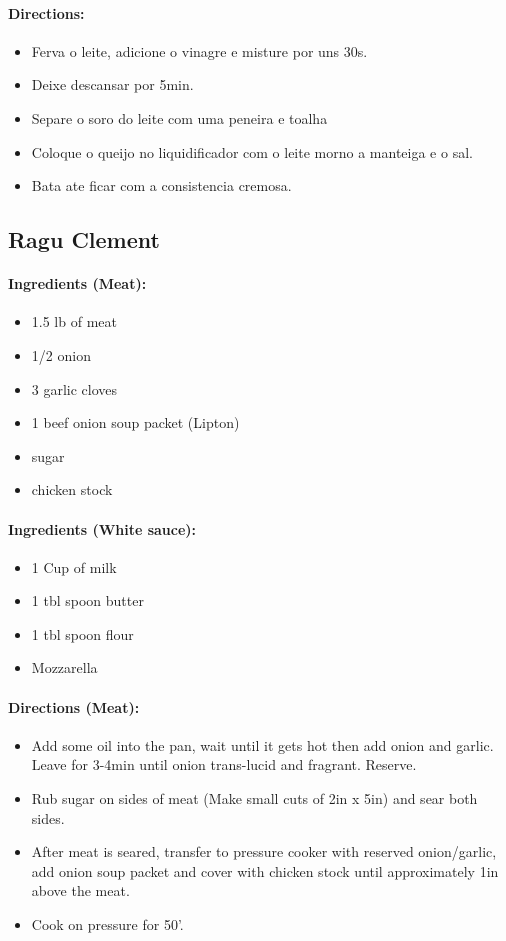 \documentclass{article}
\begin{document}
\paragraph{Directions:}
\begin{itemize}
	\item Ferva o leite, adicione o vinagre e misture por uns 30s.
	\item Deixe descansar por 5min.
	\item Separe o soro do leite com uma peneira e toalha
	\item Coloque o queijo no liquidificador com o leite morno a manteiga e o sal.
	\item Bata ate ficar com a consistencia cremosa.
\end{itemize}

\subsection{Ragu Clement}

\paragraph{Ingredients (Meat):}
\begin{itemize}
	\item 1.5 lb of meat
	\item 1/2 onion
	\item 3 garlic cloves
	\item 1 beef onion soup packet (Lipton)
	\item sugar
	\item chicken stock
\end{itemize}

\paragraph{Ingredients (White sauce):}
\begin{itemize}
	\item 1 Cup of milk
	\item 1 tbl spoon butter
	\item 1 tbl spoon flour
	\item Mozzarella
\end{itemize}

\paragraph{Directions (Meat):}
\begin{itemize}
	\item Add some oil into the pan, wait until it gets hot then add onion and garlic. Leave for 3-4min until onion trans-lucid and fragrant. Reserve.
	\item Rub sugar on sides of meat (Make small cuts of 2in x 5in) and sear both sides.
	\item After meat is seared, transfer to pressure cooker with reserved onion/garlic, add onion soup packet and cover with chicken stock until approximately 1in above the meat.
	\item Cook on pressure for 50'.
\end{itemize}
\end{document}
